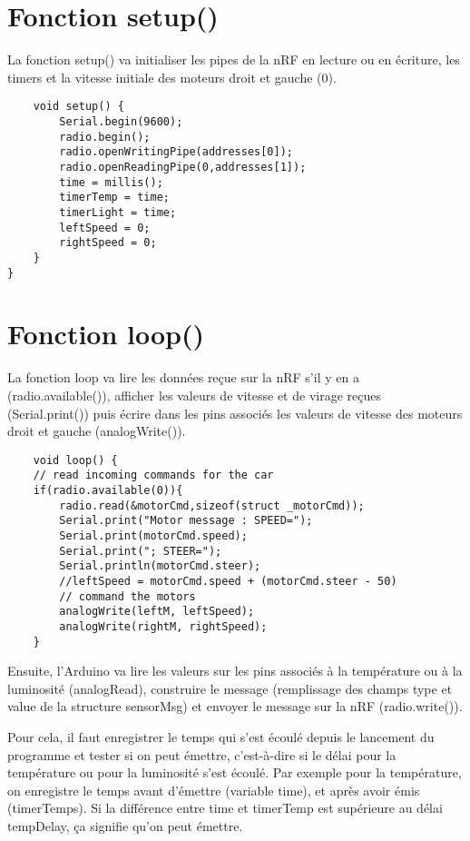 \section{Fonction setup()}

La fonction setup() va initialiser les pipes de la nRF en lecture ou en écriture, 
les timers et la vitesse initiale des moteurs droit et gauche (0). 

\bigbreak
\begin{DDbox}{\linewidth}
\begin{lstlisting}
	void setup() {
		Serial.begin(9600);
		radio.begin();
		radio.openWritingPipe(addresses[0]);
		radio.openReadingPipe(0,addresses[1]);
		time = millis();
		timerTemp = time;
		timerLight = time;
		leftSpeed = 0;
		rightSpeed = 0;
	}
}
\end{lstlisting}
\end{DDbox}



\section{Fonction loop()}

La fonction loop va lire les données reçue sur la nRF s'il y en a (radio.available()), afficher 
les valeurs de vitesse et de virage reçues (Serial.print()) puis écrire dans les pins associés 
les valeurs de vitesse des moteurs droit et gauche (analogWrite()).

\bigbreak
\begin{DDbox}{\linewidth}
\begin{lstlisting}
	void loop() {
	// read incoming commands for the car
	if(radio.available(0)){
		radio.read(&motorCmd,sizeof(struct _motorCmd));
		Serial.print("Motor message : SPEED=");
		Serial.print(motorCmd.speed);
		Serial.print("; STEER=");
		Serial.println(motorCmd.steer);
		//leftSpeed = motorCmd.speed + (motorCmd.steer - 50)
		// command the motors
		analogWrite(leftM, leftSpeed);
		analogWrite(rightM, rightSpeed);
	}

\end{lstlisting}
\end{DDbox}

Ensuite, l'Arduino va lire les valeurs sur les pins associés à la température ou à la
luminosité (analogRead), construire le message (remplissage des champs type et value
de la structure sensorMsg) et envoyer le message sur la nRF (radio.write()).

Pour cela, il faut enregistrer le temps qui s'est écoulé depuis le lancement du programme
et tester si on peut émettre, c'est-à-dire si le délai pour la température ou pour la
luminosité s'est écoulé. Par exemple pour la température, on enregistre le temps avant 
d'émettre (variable time), et après avoir émis (timerTemps). 
Si la différence entre time et timerTemp est supérieure au délai tempDelay, ça signifie qu'on
peut émettre.\\


